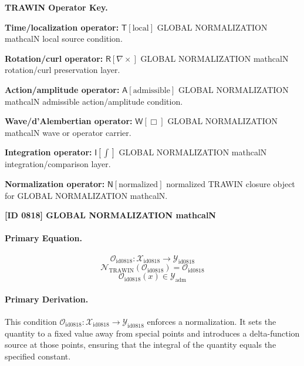 \par\vspace{0.45\baselineskip}
\noindent\begin{minipage}[t]{\linewidth}
\begingroup
\small
\raggedright
\textbf{TRAWIN Operator Key.}\par
\noindent\textbf{Time/localization operator:} $\mathsf{T}\!\left[\mathrm{local}\right]$ GLOBAL NORMALIZATION mathcalN local source condition.\par
\noindent\textbf{Rotation/curl operator:} $\mathsf{R}\!\left[\nabla\times\right]$ GLOBAL NORMALIZATION mathcalN rotation/curl preservation layer.\par
\noindent\textbf{Action/amplitude operator:} $\mathsf{A}\!\left[\mathrm{admissible}\right]$ GLOBAL NORMALIZATION mathcalN admissible action/amplitude condition.\par
\noindent\textbf{Wave/d'Alembertian operator:} $\mathsf{W}\!\left[\Box\right]$ GLOBAL NORMALIZATION mathcalN wave or operator carrier.\par
\noindent\textbf{Integration operator:} $\mathsf{I}\!\left[\int\right]$ GLOBAL NORMALIZATION mathcalN integration/comparison layer.\par
\noindent\textbf{Normalization operator:} $\mathsf{N}\!\left[\mathrm{normalized}\right]$ normalized TRAWIN closure object for GLOBAL NORMALIZATION mathcalN.\par
\endgroup
\end{minipage}

\clearpage
\noindent\textbf{[ID 0818] GLOBAL NORMALIZATION mathcalN}\par
\vspace{0.35em}
\paragraph{Primary Equation.}
\[
\mathcal{O}_{\mathrm{id0818}}:\mathcal{X}_{\mathrm{id0818}}\longrightarrow\mathcal{Y}_{\mathrm{id0818}}
\]
\[
\mathcal{N}_{\mathrm{TRAWIN}}(\mathcal{O}_{\mathrm{id0818}})=\mathcal{O}_{\mathrm{id0818}}
\]
\[
\mathcal{O}_{\mathrm{id0818}}(x)\in\mathcal{Y}_{\mathrm{adm}}
\]

\paragraph{Primary Derivation.}
This condition \( \mathcal{O}_{\mathrm{id0818}}:\mathcal{X}_{\mathrm{id0818}}\longrightarrow\mathcal{Y}_{\mathrm{id0818}} \) enforces a normalization. It sets the quantity to a fixed value away from special points and introduces a delta-function source at those points, ensuring that the integral of the quantity equals the specified constant.
